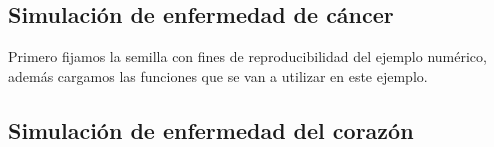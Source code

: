 \documentclass[12pt]{article}
\begin{document}
\subsection{Simulaci\'on de enfermedad de c\'ancer}

Primero fijamos la semilla con fines de reproducibilidad del ejemplo numérico, además cargamos las funciones que se van a utilizar en este ejemplo.



\subsection{Simulaci\'on de enfermedad del coraz\'on}



\newpage
\end{document}
